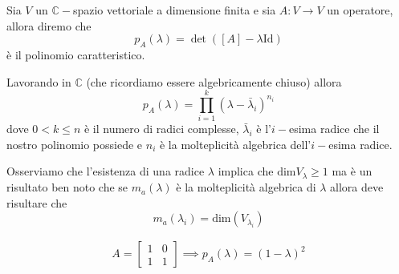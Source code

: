 \documentclass[12pt, twoside, italian, openany]{book}
\begin{document}
	\begin{definition}
		Sia $V$ un $\mathbb{C}-$spazio vettoriale a dimensione finita e sia $A: V \to V$ un operatore, allora diremo che
		$$
		p_A(\lambda) = \det{([A] - \lambda \text{Id})}
		$$
		è il polinomio caratteristico.
	\end{definition}
	\begin{remark}
		Lavorando in $\mathbb{C}$ (che ricordiamo essere algebricamente chiuso) allora
		$$
		p_A(\lambda) = \prod_{i=1}^k (\lambda - \bar{\lambda}_{i})^{n_i}
		$$
		dove $0 < k \leq n$ è il numero di radici complesse, $\bar{\lambda}_i$ è l'$i-$esima radice che il nostro polinomio possiede e $n_i$ è la molteplicità algebrica dell'$i-$esima radice.
	\end{remark}
	Osserviamo che l'esistenza di una radice $\lambda$ implica che $\text{dim}V_\lambda \geq 1$ ma è un risultato ben noto che se $m_a(\lambda)$ è la molteplicità algebrica di $\lambda$ allora deve risultare che
	$$
	m_a(\lambda_i) = \text{dim}(V_{\lambda_i})
	$$
	\begin{example}
		\begin{align*}		
			A = \begin{bmatrix}
				1 & 0 \\
				1 & 1
			\end{bmatrix} \implies p_A(\lambda) = (1 - \lambda)^2
		\end{align*}
	\end{example}
\end{document}
